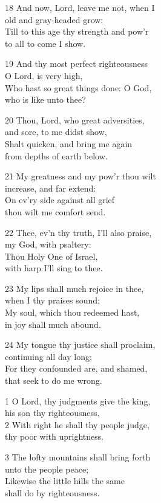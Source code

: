 \begin{multicols}{3}
18 And now, Lord, leave me not, when I\\
old and gray-headed grow:\\
Till to this age thy strength and pow’r\\
to all to come I show.

19 And thy most perfect righteousness\\
O Lord, is very high,\\
Who hast so great things done: O God,\\
who is like unto thee?

20 Thou, Lord, who great adversities,\\
and sore, to me didst show,\\
Shalt quicken, and bring me again\\
from depths of earth below.

21 My greatness and my pow’r thou wilt\\
increase, and far extend:\\
On ev’ry side against all grief\\
thou wilt me comfort send.

22 Thee, ev’n thy truth, I’ll also praise,\\
my God, with psaltery:\\
Thou Holy One of Israel,\\
with harp I’ll sing to thee.

23 My lips shall much rejoice in thee,\\
when I thy praises sound;\\
My soul, which thou redeemed hast,\\
in joy shall much abound.

24 My tongue thy justice shall proclaim,\\
continuing all day long;\\
For they confounded are, and shamed,\\
that seek to do me wrong.

1 O Lord, thy judgments give the king,\\
his son thy righteousness.\\
2 With right he shall thy people judge,\\
thy poor with uprightness.

3 The lofty mountains shall bring forth\\
unto the people peace;\\
Likewise the little hills the same\\
shall do by righteousness.


\end{multicols}
